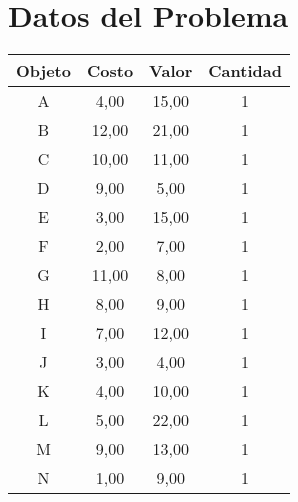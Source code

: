 \documentclass{article}
\begin{document}
\section*{Datos del Problema}
\begin{tabular}{|c|c|c|c|}
\hline
Objeto & Costo & Valor & Cantidad \\
\hline
A & 4,00 & 15,00 & 1 \\
B & 12,00 & 21,00 & 1 \\
C & 10,00 & 11,00 & 1 \\
D & 9,00 & 5,00 & 1 \\
E & 3,00 & 15,00 & 1 \\
F & 2,00 & 7,00 & 1 \\
G & 11,00 & 8,00 & 1 \\
H & 8,00 & 9,00 & 1 \\
I & 7,00 & 12,00 & 1 \\
J & 3,00 & 4,00 & 1 \\
K & 4,00 & 10,00 & 1 \\
L & 5,00 & 22,00 & 1 \\
M & 9,00 & 13,00 & 1 \\
N & 1,00 & 9,00 & 1 \\
\hline
\end{tabular}
\end{document}
